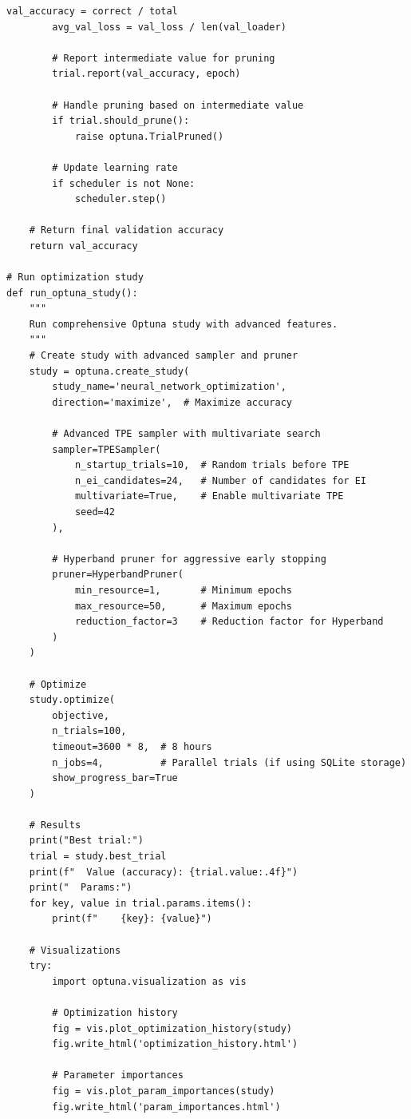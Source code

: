 \begin{lstlisting}[style=python, caption=Advanced Optuna hyperparameter optimization]
        val_accuracy = correct / total
        avg_val_loss = val_loss / len(val_loader)

        # Report intermediate value for pruning
        trial.report(val_accuracy, epoch)

        # Handle pruning based on intermediate value
        if trial.should_prune():
            raise optuna.TrialPruned()

        # Update learning rate
        if scheduler is not None:
            scheduler.step()

    # Return final validation accuracy
    return val_accuracy

# Run optimization study
def run_optuna_study():
    """
    Run comprehensive Optuna study with advanced features.
    """
    # Create study with advanced sampler and pruner
    study = optuna.create_study(
        study_name='neural_network_optimization',
        direction='maximize',  # Maximize accuracy

        # Advanced TPE sampler with multivariate search
        sampler=TPESampler(
            n_startup_trials=10,  # Random trials before TPE
            n_ei_candidates=24,   # Number of candidates for EI
            multivariate=True,    # Enable multivariate TPE
            seed=42
        ),

        # Hyperband pruner for aggressive early stopping
        pruner=HyperbandPruner(
            min_resource=1,       # Minimum epochs
            max_resource=50,      # Maximum epochs
            reduction_factor=3    # Reduction factor for Hyperband
        )
    )

    # Optimize
    study.optimize(
        objective,
        n_trials=100,
        timeout=3600 * 8,  # 8 hours
        n_jobs=4,          # Parallel trials (if using SQLite storage)
        show_progress_bar=True
    )

    # Results
    print("Best trial:")
    trial = study.best_trial
    print(f"  Value (accuracy): {trial.value:.4f}")
    print("  Params:")
    for key, value in trial.params.items():
        print(f"    {key}: {value}")

    # Visualizations
    try:
        import optuna.visualization as vis

        # Optimization history
        fig = vis.plot_optimization_history(study)
        fig.write_html('optimization_history.html')

        # Parameter importances
        fig = vis.plot_param_importances(study)
        fig.write_html('param_importances.html')


\end{lstlisting}
